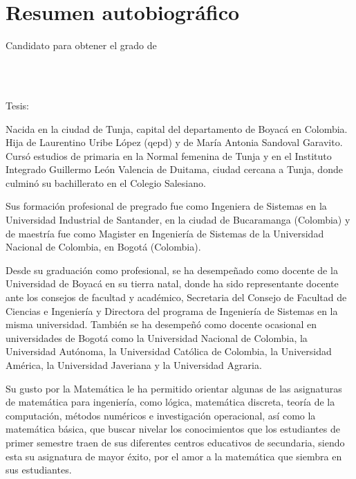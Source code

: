 
\chapter*{Resumen autobiográfico}
\thispagestyle{empty}

\begin{center}
\autor

Candidato para obtener el grado de\\
\grado\\
\orientacion\bigskip

\uanl\\
\fime\bigskip

Tesis:\\
\textsc{\large\titulo}
\end{center}\bigskip

Nacida en la  ciudad de Tunja, capital del departamento de Boyacá en Colombia. Hija de Laurentino Uribe López (qepd) y de María Antonia Sandoval Garavito. Cursó estudios de primaria en la Normal femenina de Tunja y en el Instituto Integrado Guillermo León Valencia de Duitama, ciudad cercana a Tunja, donde culminó su bachillerato en el Colegio Salesiano. 

Sus formación profesional de pregrado fue como Ingeniera de Sistemas en la Universidad Industrial de Santander, en la ciudad de Bucaramanga (Colombia) y de maestría fue como Magister en Ingeniería de Sistemas de la Universidad Nacional de Colombia, en Bogotá (Colombia).

Desde su graduación como profesional, se ha desempeñado como docente de la Universidad de Boyacá en su tierra natal, donde ha sido representante docente ante los consejos de facultad y académico, Secretaria del Consejo de Facultad de Ciencias e Ingeniería y Directora del programa de Ingeniería de Sistemas en la misma universidad. También se ha desempeñó como docente ocasional en universidades de Bogotá como la Universidad Nacional de Colombia, la Universidad Autónoma, la Universidad Católica de Colombia, la Universidad América, la Universidad Javeriana y la Universidad Agraria.

Su gusto por la Matemática le ha permitido orientar algunas de las asignaturas de matemática para ingeniería, como lógica, matemática discreta, teoría de la computación, métodos numéricos e investigación operacional, así como la matemática básica, que buscar nivelar los conocimientos que los estudiantes de primer semestre traen de sus diferentes centros educativos de secundaria, siendo esta su asignatura de mayor éxito, por el amor a la matemática que siembra en sus estudiantes.
